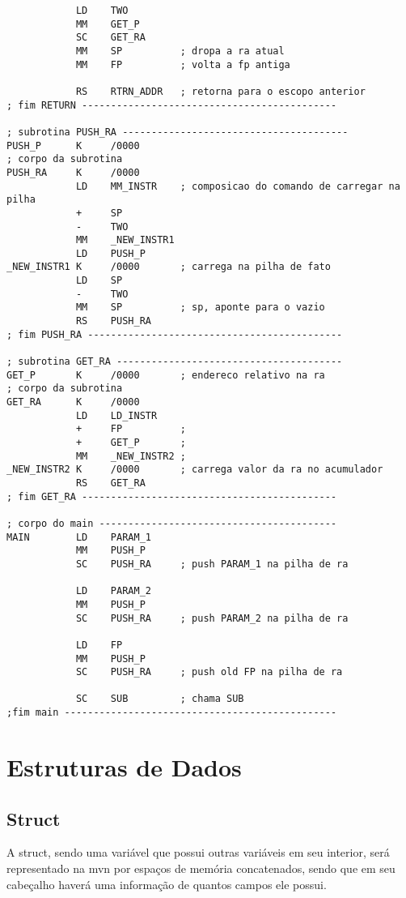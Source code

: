 \begin{lstlisting}
            LD    TWO
            MM    GET_P
            SC    GET_RA
            MM    SP          ; dropa a ra atual
            MM    FP          ; volta a fp antiga

            RS    RTRN_ADDR   ; retorna para o escopo anterior
; fim RETURN --------------------------------------------

; subrotina PUSH_RA ---------------------------------------
PUSH_P      K     /0000
; corpo da subrotina
PUSH_RA     K     /0000
            LD    MM_INSTR    ; composicao do comando de carregar na pilha
            +     SP
            -     TWO
            MM    _NEW_INSTR1
            LD    PUSH_P
_NEW_INSTR1 K     /0000       ; carrega na pilha de fato  
            LD    SP          
            -     TWO
            MM    SP          ; sp, aponte para o vazio 
            RS    PUSH_RA
; fim PUSH_RA --------------------------------------------

; subrotina GET_RA ---------------------------------------
GET_P       K     /0000       ; endereco relativo na ra
; corpo da subrotina
GET_RA      K     /0000
            LD    LD_INSTR
            +     FP          ; 
            +     GET_P       ;
            MM    _NEW_INSTR2 ;
_NEW_INSTR2 K     /0000       ; carrega valor da ra no acumulador
            RS    GET_RA
; fim GET_RA --------------------------------------------

; corpo do main -----------------------------------------
MAIN        LD    PARAM_1     
            MM    PUSH_P   
            SC    PUSH_RA     ; push PARAM_1 na pilha de ra

            LD    PARAM_2     
            MM    PUSH_P   
            SC    PUSH_RA     ; push PARAM_2 na pilha de ra

            LD    FP     
            MM    PUSH_P         
            SC    PUSH_RA     ; push old FP na pilha de ra

            SC    SUB         ; chama SUB
;fim main -----------------------------------------------

\end{lstlisting}

\section{Estruturas de Dados}

\subsection{Struct}
A struct, sendo uma variável que possui outras variáveis em seu interior, será representado na mvn por espaços de memória concatenados, sendo que em seu cabeçalho haverá uma informação de quantos campos ele possui.

